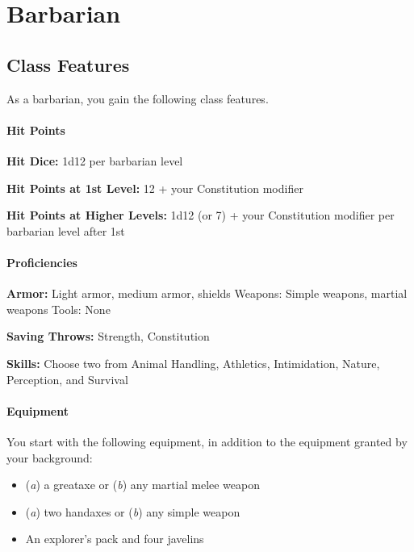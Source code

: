 \documentclass[
]{article}
\date{}
\providecommand{\tightlist}{%
  \setlength{\itemsep}{0pt}\setlength{\parskip}{0pt}}
\begin{document}
\hypertarget{barbarian}{%
\section{Barbarian}\label{barbarian}}

\hypertarget{class-features}{%
\subsection{Class Features}\label{class-features}}

As a barbarian, you gain the following class features.

\hypertarget{hit-points}{%
\paragraph{Hit Points}\label{hit-points}}

\textbf{Hit Dice:} 1d12 per barbarian level

\textbf{Hit Points at 1st Level:} 12 + your Constitution modifier

\textbf{Hit Points at Higher Levels:} 1d12 (or 7) + your Constitution
modifier per barbarian level after 1st

\hypertarget{proficiencies}{%
\paragraph{Proficiencies}\label{proficiencies}}

\textbf{Armor:} Light armor, medium armor, shields Weapons: Simple
weapons, martial weapons Tools: None

\textbf{Saving Throws:} Strength, Constitution

\textbf{Skills:} Choose two from Animal Handling, Athletics,
Intimidation, Nature, Perception, and Survival

\hypertarget{equipment}{%
\paragraph{Equipment}\label{equipment}}

You start with the following equipment, in addition to the equipment
granted by your background:

\begin{itemize}
\tightlist
\item
  (\emph{a}) a greataxe or (\emph{b}) any martial melee weapon
\item
  (\emph{a}) two handaxes or (\emph{b}) any simple weapon
\item
  An explorer's pack and four javelins
\end{itemize}
\end{document}
